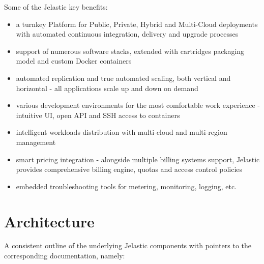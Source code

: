 \documentclass[9pt,twocolumn,twoside]{styles/osajnl}
\begin{document}
Some of the Jelastic key benefits:
\begin{itemize}
\renewcommand{\labelitemi}{\scriptsize$\square$}
\item a turnkey Platform for Public, Private, Hybrid and Multi-Cloud deployments
with automated continuous integration, delivery and upgrade processes
\item support of numerous software stacks, extended with cartridges packaging
model and custom Docker containers\cite{www-jelastic2}
\item automated replication and true automated scaling, both vertical and
horizontal - all applications scale up and down on demand
\item various development environments for the most comfortable work experience
- intuitive UI, open API and SSH access to containers
\item intelligent workloads distribution with multi-cloud and multi-region
management\cite{paper-jelastic2}
\item smart pricing integration - alongside multiple billing systems support, 
Jelastic provides comprehensive billing engine, quotas and access control
policies
\item embedded troubleshooting tools for metering, monitoring, logging, etc.
\end{itemize}\cite{www-jelastic1}

\section{Architecture}
A consistent outline of the underlying Jelastic components with pointers to the
corresponding documentation, namely:\cite{www-jelastic3}
%
\end{document}

